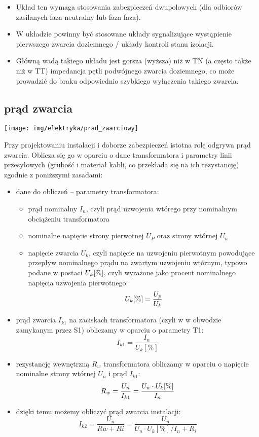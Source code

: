 \begin{itemize}
{		}.
	\item Układ ten wymaga stosowania zabezpieczeń dwupolowych (dla odbiorów zasilanych faza-neutralny lub faza-faza).
	\item W układzie powinny być stosowane układy sygnalizujące wystąpienie pierwszego zwarcia doziemnego / układy kontroli stanu izolacji.
	\item Główną wadą takiego układu jest gorsza (wyższa) niż w TN (a często także niż w TT) impedancja pętli podwójnego zwarcia doziemnego, co może prowadzić do braku odpowiednio szybkiego wyłączenia takiego zwarcia.
\end{itemize}

\subsection{prąd zwarcia}

\begin{center}\texttt{[image: img/elektryka/prad\_zwarciowy]}\end{center}

Przy projektowaniu instalacji i doborze zabezpieczeń istotna rolę odgrywa prąd zwarcia.
Oblicza się go w oparciu o dane transformatora i parametry linii przesyłowych (grubość i materiał kabli, co przekłada się na ich rezystancję) zgodnie z poniższymi zasadami:

\begin{itemize}
	\item dane do obliczeń – parametry transformatora:
	\begin{itemize}
		\item prąd nominalny $I_n$, czyli prąd uzwojenia wtórego przy nominalnym obciążeniu transformatora
		\item nominalne napięcie strony pierwotnej $U_P$ oraz strony wtórnej $U_n$
		\item napięcie zwarcia $U_k$, czyli napięcie na uzwojeniu pierwotnym powodujące przepływ nominalnego prądu na zwartym uzwojeniu wtórnym,
			typowo podane w postaci $U_k{\rm [\%]}$, czyli wyrażone jako procent nominalnego napięcia uzwojenia pierwotnego:
				$$U_k{\rm [\%]}=\frac{U_p}{U_k}$$
	\end{itemize}
	\item prąd zwarcia $I_{k1}$ na zaciskach transformatora (czyli w w obwodzie zamykanym przez S1) obliczamy w oparciu o parametry T1:
		$$I_{k1} = \frac{I_n}{U_k[\%]}$$
	\item rezystancję wewnętrzną $R_w$ transformatora obliczamy w oparciu o napięcie nominalne strony wtórnej $U_n$ i prąd $I_{k1}$:
		$$R_w = \frac{U_n}{I_{k1}} = \frac{U_n \cdot U_k{\rm [\%]}}{I_n}$$
	\item dzięki temu możemy obliczyć prąd zwarcia instalacji:
		$$I_{k2} = \frac{U_n}{Rw + Ri} = \frac{U_n}{U_n \cdot U_k[\%]/I_n + R_i}$$
\end{itemize}

